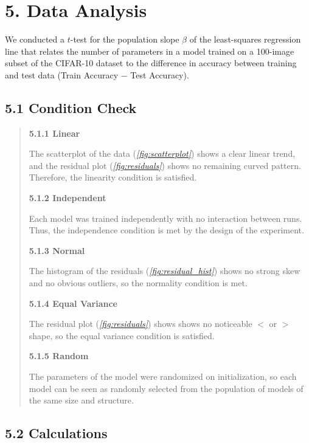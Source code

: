 \documentclass[12pt]{article}
\begin{document}
    \section*{5. Data Analysis}

    We conducted a $t$-test for the population slope $\beta$ of the least-squares regression line that relates the number of parameters in a model trained on a 100-image subset of the CIFAR-10 dataset to the difference in accuracy between training and test data (Train Accuracy $-$ Test Accuracy).

    \subsection*{5.1 Condition Check}

    \begin{quote}

    \textbf{5.1.1 Linear}

    The scatterplot of the data (\textit{\autoref{fig:scatterplot}}) shows a clear linear trend, and the residual plot (\textit{\autoref{fig:residuals}}) shows no remaining curved pattern.
    Therefore, the linearity condition is satisfied.

    \textbf{5.1.2 Independent}

    Each model was trained independently with no interaction between runs. Thus, the independence condition is met by the design of the experiment.

    \textbf{5.1.3 Normal}

    The histogram of the residuals (\textit{\autoref{fig:residual_hist}}) shows no strong skew and no obvious outliers,
    so the normality condition is met.

    \textbf{5.1.4 Equal Variance}

    The residual plot (\textit{\autoref{fig:residuals}}) shows shows no noticeable $<$ or $>$ shape, so the equal variance condition is satisfied.

    \textbf{5.1.5 Random}

    The parameters of the model were randomized on initialization, so each model can be seen as randomly selected from the population
    of models of the same size and structure.

    \end{quote}

    \subsection*{5.2 Calculations}
\end{document}
